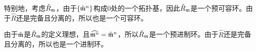 \begin{para}
特别地，考虑$\hat R_{\mathfrak{m}}$，由于$\{\hat {\mathfrak{m}}^n\}$构成$0$处的一个拓扑基，因此$\hat R_{\mathfrak{m}}$是一个预可容环。由于$\hat R$还是完备且分离的，所以也是一个可容环。

由于$\hat {\mathfrak{m}}$是$\hat R_{\mathfrak{m}}$的定义理想，且$\widehat{\mathfrak{m}^n}=\hat{\mathfrak{m}}^n$，所以$\hat R_{\mathfrak{m}}$是一个预进制环。由于$\hat R$还是完备且分离的，所以也是一个进制环。
\end{para}






